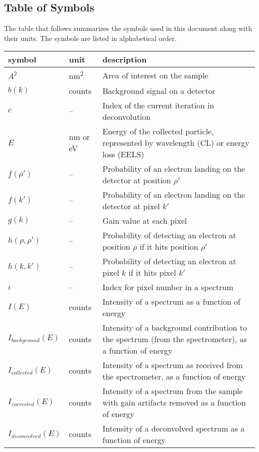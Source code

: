 \documentclass[12pt]{article}
\begin{document}
\subsection{Table of Symbols}

The table that follows summarizes the symbols used in this document along with
their units. The symbols are listed in alphabetical order.

\renewcommand{\arraystretch}{1.2}
\noindent \begin{longtable*}{l l p{12cm}} \toprule
\textbf{symbol} & \textbf{unit} & \textbf{description}\\
\midrule 
$A^2$ & \si{\nano\metre^2} & Area of interest on the sample\\
$b(k)$ & counts & Background signal on a detector\\
$c$ & -- & Index of the current iteration in deconvolution \\
$E$ & \si{\nano\metre} or \si{\electronvolt} & Energy of the collected particle,
represented by wavelength (CL) or energy loss (EELS)\\
$f(\rho')$ & -- & Probability of an electron landing on the detector at position
$\rho'$\\
$f(k')$ & -- & Probability of an electron landing on the detector at pixel
$k'$\\
$g(k)$ & -- & Gain value at each pixel\\
$h(\rho, \rho')$ & -- & Probability of detecting an electron at position $\rho$
if it hits position $\rho'$\\
$h(k, k')$ & -- & Probability of detecting an electron at pixel $k$ if it hits
pixel $k'$\\
$i$ & -- & Index for pixel number in a spectrum\\
$I(E)$ & counts & Intensity of a spectrum as a function of energy\\
$I_{background}(E)$ & counts & Intensity of a background contribution to the
spectrum (from the spectrometer), as a function of energy\\
$I_{collected}(E)$ & counts & Intensity of a spectrum as received from the
spectrometer, as a function of energy\\
$I_{corrected}(E)$ & counts & Intensity of a spectrum from the sample with gain
artifacts removed as a function of energy\\
$I_{deconvolved}(E)$ & counts & Intensity of a deconvolved spectrum as a
function of energy\\

\end{longtable*}
\end{document}
